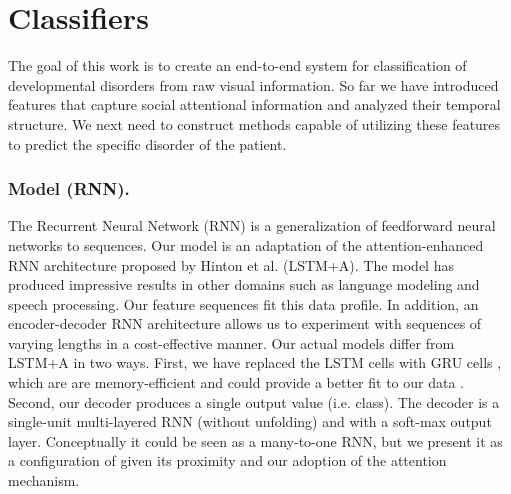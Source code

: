 \documentclass{llncs}
\begin{document}
       



\vspace{-2em}
\section{Classifiers}
\vspace*{-\baselineskip}

\label{sec:classification}
The goal of this work is to create an end-to-end system for classification of developmental disorders from raw visual information. So far we have introduced features that capture social attentional information and analyzed their temporal structure. We next need to construct methods capable of utilizing these features to predict the specific disorder of the patient.  
\vspace*{-\baselineskip}
\subsubsection{Model (RNN).} The Recurrent Neural Network (RNN) is a generalization of feedforward neural networks to sequences. Our model is an adaptation of the attention-enhanced RNN architecture proposed by Hinton et al. \cite{NIPS2015_5635} (LSTM+A). The model has produced impressive results in other domains such as language modeling and speech processing. Our feature sequences fit this data profile. In addition, an encoder-decoder RNN architecture allows us to experiment with sequences of varying lengths in a cost-effective manner. Our actual models differ from LSTM+A in two ways. First, we have replaced the LSTM cells with GRU cells \cite{Cho}, which are are memory-efficient and could provide a better fit to our data \cite{JozefowiczZS15}. Second, our decoder produces a single output value (i.e. class). The decoder is a single-unit multi-layered RNN (without unfolding) and with a soft-max output layer. Conceptually it could be seen as a many-to-one RNN, but we present it as a configuration of \cite{NIPS2015_5635} given its proximity and our adoption of the attention mechanism.
\end{document}
